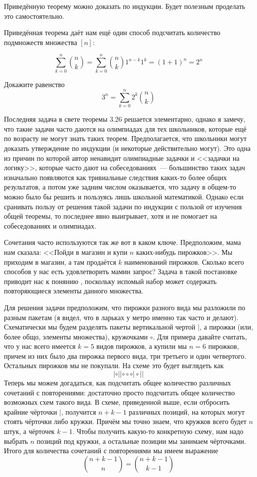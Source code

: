 \begin{exercise}
Приведённую теорему можно доказать по индукции. Будет полезным проделать это самостоятельно.
\end{exercise}

Приведённая теорема даёт нам ещё один способ подсчитать количество подмножеств множества $[n]$:

$$\sum_{k=0}^n {n \choose k} = \sum_{k=0}^n {n \choose k}1^{n-k}1^k = (1+1)^n = 2^n$$

\begin{exercise}
Докажите равенство
$$3^n = \sum_{k=0}^{n} 2^k {n \choose k}$$
\end{exercise}

Последняя задача в свете теоремы 3.26 решается элементарно, однако я замечу, что такие задачи часто даются на олимпиадах для тех школьников, которые ещё по возрасту не могут знать таких теорем. Предполагается, что школьники могут доказать утверждение по индукции (и некоторые действительно могут). Это одна из причин по которой автор ненавидит олимпиадные задачки и <<задачки на логику>>, которые часто дают на собеседованиях~--- большинство таких задач изначально появляются как тривиальные следствия каких-то более общих результатов, а потом уже задним числом оказывается, что задачу в общем-то можно было бы решить и пользуясь лишь школьной математикой. Однако если сранивать пользу от решения такой задачи по индукции с пользой от изучения общей теоремы, то последнее явно выигрывает, хотя и не помогает на собеседованиях и олимпиадах.

Сочетания часто используются так же вот в каком ключе. Предположим, мама нам сказала: <<Пойди в магазин и купи $n$ каких-нибудь пирожков>>. Мы приходим в магазин, а там продаётся $k$ наименований пирожков. Сколько всего способов у нас есть удовлетворить мамин запрос? Задача в такой постановке приводит нас к понянию , поскольку испомый набор может содержать повторяющиеся элементы данного множества.

Для решения задачи предположим, что пирожки разного вида мы разложили по разным пакетам (я видел, что в ларьках у метро именно так часто и делают). Схематически мы будем разделять пакеты вертикальной чертой $|$, а пирожки (или, более общо, элементы множества), кружочками $\circ$. Для примера давайте считать, что у нас всего имеется $k=5$ видов пирожков, а купили мы $n=6$ пирожков, причем из них было два пирожка первого вида, три третьего и один четвертого. Остальных пирожков мы не покупали. На схеме это будет выглядеть как
$$|\circ||\circ\circ\circ|\circ||$$
Теперь мы можем догадаться, как подсчитать общее количество различных сочетаний с повторениями: достаточно просто подсчитать общее количество возможных схем такого вида. В схеме, приведенной выше, если отбросить крайние чёрточки $|$, получится $n+k-1$ различных позиций, на которых могут стоять чёрточки либо кружки. Причём мы точно знаем, что кружков всего будет $n$ штук, а чёрточек $k-1$. Чтобы получить какую-то конкретную схему, нам надо выбрать $n$ позиций под кружки, а остальные позиции мы занимаем чёрточками. Итого для количества сочетаний с повторениями мы имеем выражение
$${n+k-1 \choose n} = {n+k-1\choose k - 1}$$

